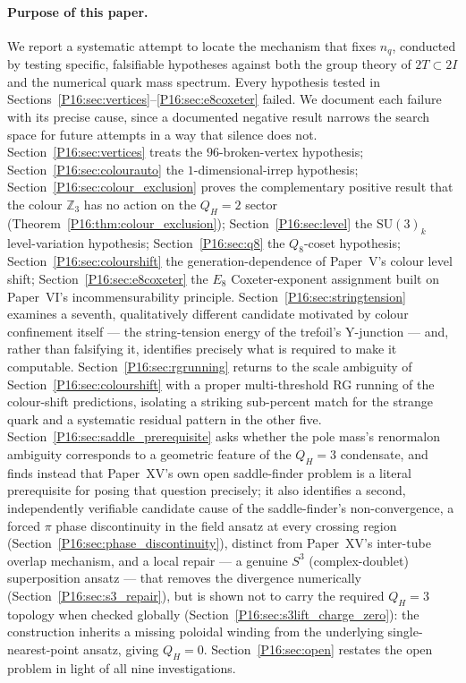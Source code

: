 \documentclass[11pt,a4paper]{article}
\theoremstyle{definition}\newtheorem{definition}[theorem]{Definition}
\theoremstyle{remark}
\theoremstyle{definition}\newtheorem{construction}[theorem]{Construction}
\newcommand{\SU}{\mathrm{SU}}
\newcommand{\twoI}{2I}
\newcommand{\twoT}{2T}
\newcommand{\QH}{Q_H}
\begin{document}
\paragraph{Purpose of this paper.}
We report a systematic attempt to locate the mechanism that fixes
$n_q$, conducted by testing specific, falsifiable hypotheses against
both the group theory of $\twoT\subset\twoI$ and the numerical quark
mass spectrum. Every hypothesis tested in
Sections~\ref{P16:sec:vertices}--\ref{P16:sec:e8coxeter} failed. We document
each failure with its precise cause, since a documented negative
result narrows the search space for future attempts in a way that
silence does not. Section~\ref{P16:sec:vertices} treats the
$96$-broken-vertex hypothesis; Section~\ref{P16:sec:colourauto} the
$1$-dimensional-irrep hypothesis;
Section~\ref{P16:sec:colour_exclusion} proves the complementary positive
result that the colour $\mathbb{Z}_3$ has no action on the $\QH=2$
sector (Theorem~\ref{P16:thm:colour_exclusion}); Section~\ref{P16:sec:level} the
$\SU(3)_k$ level-variation hypothesis; Section~\ref{P16:sec:q8} the $Q_8$-coset
hypothesis; Section~\ref{P16:sec:colourshift} the generation-dependence of
Paper~V's colour level shift; Section~\ref{P16:sec:e8coxeter} the $E_8$
Coxeter-exponent assignment built on Paper~VI's incommensurability
principle. Section~\ref{P16:sec:stringtension} examines a seventh,
qualitatively different candidate motivated by colour confinement
itself --- the string-tension energy of the trefoil's Y-junction ---
and, rather than falsifying it, identifies precisely what is required
to make it computable. Section~\ref{P16:sec:rgrunning} returns to the
scale ambiguity of Section~\ref{P16:sec:colourshift} with a proper
multi-threshold RG running of the colour-shift predictions, isolating
a striking sub-percent match for the strange quark and a systematic
residual pattern in the other five. Section~\ref{P16:sec:saddle_prerequisite}
asks whether the pole mass's renormalon ambiguity corresponds to a
geometric feature of the $\QH=3$ condensate, and finds instead that
Paper~XV's own open saddle-finder problem is a literal prerequisite
for posing that question precisely; it also identifies a second,
independently verifiable candidate cause of the saddle-finder's
non-convergence, a forced $\pi$ phase discontinuity in the field
ansatz at every crossing region
(Section~\ref{P16:sec:phase_discontinuity}), distinct from Paper~XV's
inter-tube overlap mechanism, and a local repair --- a genuine $S^3$
(complex-doublet) superposition ansatz --- that removes the
divergence numerically (Section~\ref{P16:sec:s3_repair}), but is shown
not to carry the required $\QH=3$ topology when checked globally
(Section~\ref{P16:sec:s3lift_charge_zero}): the construction inherits a
missing poloidal winding from the underlying single-nearest-point
ansatz, giving $\QH=0$. Section~\ref{P16:sec:open} restates
the open problem in light of all nine investigations.
\end{document}
